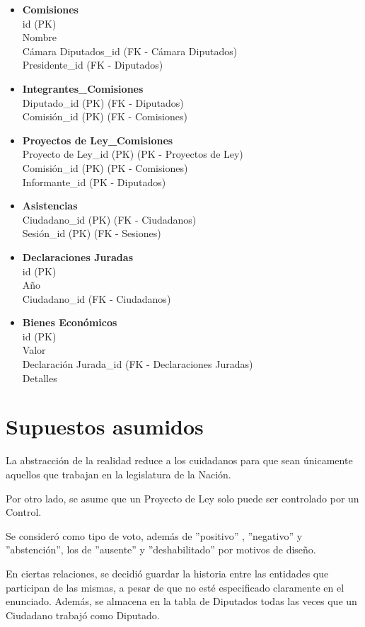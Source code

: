 \begin{itemize}
 	\item \textbf{Comisiones} \\
 	id (PK) \\
 	Nombre \\
 	Cámara Diputados\_id (FK - Cámara Diputados) \\
 	Presidente\_id (FK - Diputados)
 	
	\item \textbf{Integrantes\_Comisiones} \\
	Diputado\_id (PK) (FK - Diputados) \\
	Comisión\_id (PK) (FK - Comisiones) 
	
	\item \textbf{Proyectos de Ley\_Comisiones} \\
	Proyecto de Ley\_id (PK) (PK - Proyectos de Ley) \\
	Comisión\_id (PK) (PK - Comisiones) \\
	Informante\_id (PK - Diputados)
	
	
	\item \textbf{Asistencias} \\
	Ciudadano\_id (PK) (FK - Ciudadanos) \\
	Sesión\_id (PK) (FK - Sesiones)
	
	\item \textbf{Declaraciones Juradas} \\
	id (PK) \\
	Año \\
	Ciudadano\_id (FK - Ciudadanos)
	
	\item \textbf{Bienes Económicos} \\
	id (PK) \\
	Valor \\
	Declaración Jurada\_id (FK - Declaraciones Juradas) \\
	Detalles \\ 
	
\end{itemize}

\newpage

\section{Supuestos asumidos}
La abstracción de la realidad reduce a los cuidadanos para que sean únicamente aquellos que trabajan en la legislatura de la Nación.


Por otro lado, se asume que un Proyecto de Ley solo puede ser controlado por un Control. 


Se consideró como tipo de voto, además de ''positivo'' , ''negativo'' y ''abstención'', los de ''ausente'' y ''deshabilitado'' por motivos de diseño.


En ciertas relaciones, se decidió guardar la historia entre las entidades que participan de las mismas, a pesar de que no esté especificado claramente en el enunciado.
Además, se almacena en la tabla de Diputados todas las veces que un Ciudadano trabajó como Diputado. 



